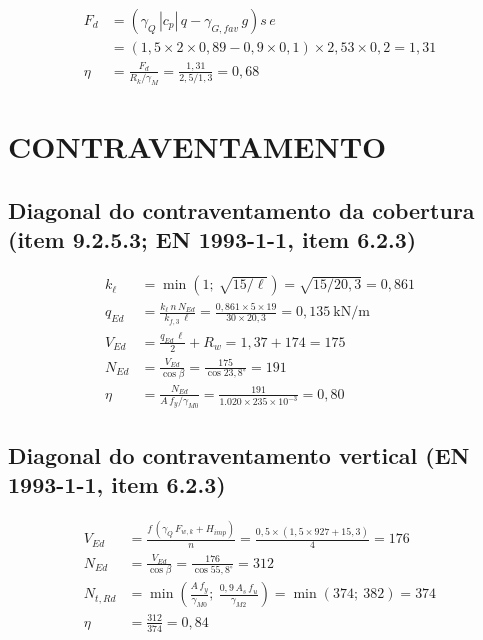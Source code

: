 \begin{align}
    F_{d} &= \left(\gamma_Q\,|c_p|\,q - \gamma_{G,fav}\,g\right) s\,e \nonumber \\
    &= (1{,}5 \times 2 \times 0{,}89 - 0{,}9 \times 0{,}1) \times 2{,}53 \times 0{,}2 = 1{,}31 \nonumber \\
    \eta &= \frac{F_d}{R_k/\gamma_M} = \frac{1{,}31}{2{,}5/1{,}3} = 0{,}68
    \label{eq:mem-telha}
\end{align}
\section{CONTRAVENTAMENTO}\label{sec:mem-contraventamento}

\subsection*{Diagonal do contraventamento da cobertura (item 9.2.5.3; EN 1993-1-1, item 6.2.3)}

\begin{align}
    k_\ell &= \min\left(1;\ \sqrt{15/\ell}\right) = \sqrt{15/20{,}3} = 0{,}861 \nonumber \\
    q_{Ed} &= \frac{k_\ell\,n\,N_{Ed}}{k_{f,3}\,\ell} = \frac{0{,}861 \times 5 \times 19}{30 \times 20{,}3} = 0{,}135~\text{kN/m} \nonumber \\
    V_{Ed} &= \frac{q_{Ed}\,\ell}{2} + R_w = 1{,}37 + 174 = 175 \nonumber \\
    N_{Ed} &= \frac{V_{Ed}}{\cos\beta} = \frac{175}{\cos 23{,}8^\circ} = 191 \nonumber \\
    \eta &= \frac{N_{Ed}}{A\,f_y/\gamma_{M0}} = \frac{191}{1.020 \times 235 \times 10^{-3}} = 0{,}80
    \label{eq:mem-cv-cobertura}
\end{align}
\subsection*{Diagonal do contraventamento vertical (EN 1993-1-1, item 6.2.3)}

\begin{align}
    V_{Ed} &= \frac{f\,(\gamma_Q\,F_{w,k} + H_{imp})}{n} = \frac{0{,}5 \times (1{,}5 \times 927 + 15{,}3)}{4} = 176 \nonumber \\
    N_{Ed} &= \frac{V_{Ed}}{\cos\beta} = \frac{176}{\cos 55{,}8^\circ} = 312 \nonumber \\
    N_{t,Rd} &= \min\left(\frac{A\,f_y}{\gamma_{M0}};\ \frac{0{,}9\,A_s\,f_u}{\gamma_{M2}}\right) = \min(374;\ 382) = 374 \nonumber \\
    \eta &= \frac{312}{374} = 0{,}84
    \label{eq:mem-cv-vertical}
\end{align}
